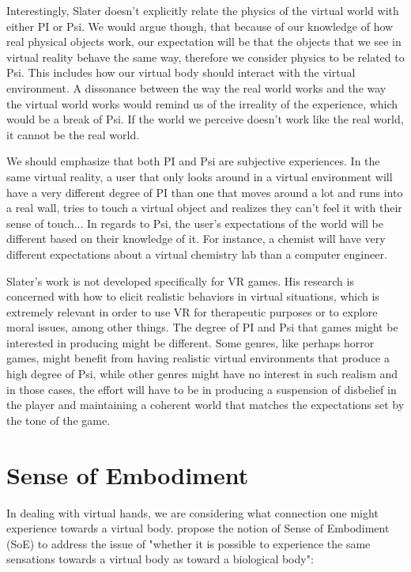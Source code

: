 Interestingly, Slater doesn't explicitly relate the physics of the virtual world with either PI or Psi. We would argue though, that because of our knowledge of how real physical objects work, our expectation will be that the objects that we see in virtual reality behave the same way, therefore we consider physics to be related to Psi. This includes how our virtual body should interact with the virtual environment. A dissonance between the way the real world works and the way the virtual world works would remind us of the irreality of the experience, which would be a break of Psi. If the world we perceive doesn't work like the real world, it cannot be the real world. 

We should emphasize that both PI and Psi are subjective experiences. In the same virtual reality, a user that only looks around in a virtual environment will have a very different degree of PI than one that moves around a lot and runs into a real wall, tries to touch a virtual object and realizes they can't feel it with their sense of touch... In regards to Psi, the user's expectations of the world will be different based on their knowledge of it. For instance, a chemist will have very different expectations about a virtual chemistry lab than a computer engineer.

Slater's work is not developed specifically for VR games. His research is concerned with how to elicit realistic behaviors in virtual situations, which is extremely relevant in order to use VR for therapeutic purposes or to explore moral issues, among other things. The degree of PI and Psi that games might be interested in producing might be different. Some genres, like perhaps horror games, might benefit from having realistic virtual environments that produce a high degree of Psi, while other genres might have no interest in such realism and in those cases, the effort will have to be in producing a suspension of disbelief \parencite{Ferri2007} in the player and maintaining a coherent world that matches the expectations set by the tone of the game.

\section{Sense of Embodiment}
\label{sec:embodiment}

In dealing with virtual hands, we are considering what connection one might experience towards a virtual body. \parencite{Kilteni2012} propose the notion of Sense of Embodiment (SoE) to address the issue of "whether it is possible to experience the same sensations towards a virtual body as toward a biological body":


